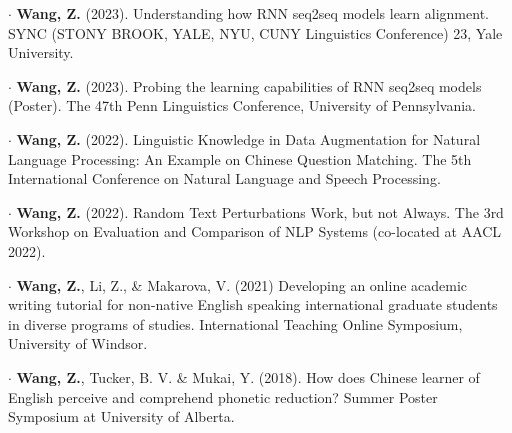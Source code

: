 \documentclass[letterpaper,11pt]{article}
\newcommand{\resumeSubHeadingListStart}{\begin{itemize}[leftmargin=0.15in, label={}]}
\newcommand{\resumeSubHeadingListEnd}{\end{itemize}}
\begin{document}
  \resumeSubHeadingListStart
    \small{\item{
%        
%        
        $\cdot$ \textbf{Wang, Z.} (2023). Understanding how RNN seq2seq models learn alignment. SYNC (STONY BROOK, YALE, NYU, CUNY Linguistics Conference) 23, Yale University. \\ \vspace{2pt}
        
        $\cdot$ \textbf{Wang, Z.} (2023). Probing the learning capabilities of RNN seq2seq models (Poster). The 47th Penn Linguistics Conference, University of Pennsylvania. \\ \vspace{2pt}
        
        $\cdot$ \textbf{Wang, Z.} (2022). Linguistic Knowledge in Data Augmentation for Natural Language Processing: An Example on Chinese Question Matching. The 5th International Conference on Natural Language and Speech Processing. \\ \vspace{2pt}
        
        $\cdot$ \textbf{Wang, Z.} (2022). Random Text Perturbations Work, but not Always. The 3rd Workshop on Evaluation and Comparison of NLP Systems (co-located at AACL 2022). \\ \vspace{2pt}
        
        $\cdot$ \textbf{Wang, Z.}, Li, Z., \& Makarova, V. (2021) Developing an online academic writing tutorial for non-native English speaking international graduate students in diverse programs of studies. International Teaching Online Symposium, University of Windsor. \\ \vspace{2pt}
        
        $\cdot$ \textbf{Wang, Z.}, Tucker, B. V. \& Mukai, Y. (2018). How does Chinese learner of English perceive and comprehend phonetic reduction? Summer Poster Symposium at University of Alberta.
    }} 
  \resumeSubHeadingListEnd
  
\end{document}
